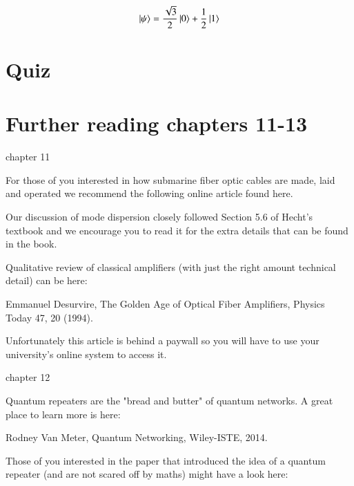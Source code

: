 \newpage
\begin{exercises}
\begin{equation*}
\left| \psi \right\rangle = \frac{\sqrt{3}}{2}\left| 0 \right\rangle + \frac{1}{2}\left| 1 \right\rangle
\end{equation*}


\end{exercises}

\newpage
\section*{Quiz}


\section*{Further reading chapters 11-13}

chapter 11

For those of you interested in how submarine fiber optic cables are made, laid and operated we recommend the following online article found here.

Our discussion of mode dispersion closely followed Section 5.6 of Hecht’s textbook and we encourage you to read it for the extra details that can be found in the book.

Qualitative review of classical amplifiers (with just the right amount technical detail) can be here:

Emmanuel Desurvire, The Golden Age of Optical Fiber Amplifiers, Physics Today 47, 20 (1994).

Unfortunately this article is behind a paywall so you will have to use your university’s online system to access it.

chapter 12

Quantum repeaters are the "bread and butter" of quantum networks. A great place to learn more is here:

Rodney Van Meter, Quantum Networking, Wiley-ISTE, 2014.

Those of you interested in the paper that introduced the idea of a quantum repeater (and are not scared off by maths) might have a look here:

